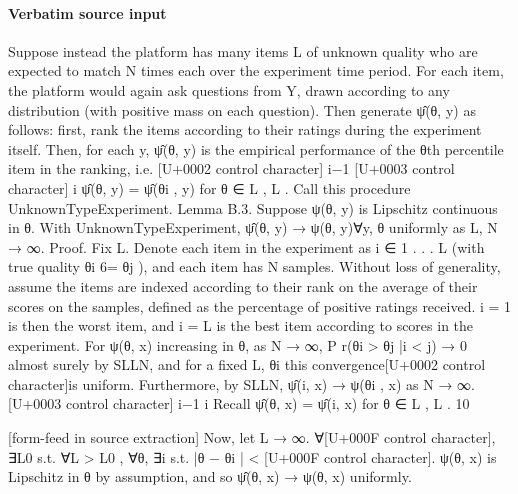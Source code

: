 \documentclass[10pt]{article}
\begin{document}
\paragraph{Verbatim source input}
\begin{ReviewVerbatim}
Suppose instead the platform has many items L of unknown quality who are expected to match N
times each over the experiment time period. For each item, the platform would again ask questions
from Y, drawn according to any distribution (with positive mass on each question). Then generate
ψ̂(θ, y) as follows: first, rank the items according to their ratings during the experiment itself.
Then, for each y, ψ̂(θ, y) is
the empirical
performance of the θth percentile item in the ranking, i.e.
[U+0002 control character] i−1
[U+0003 control character]
i
ψ̂(θ, y) = ψ̂(θi , y) for θ ∈ L , L . Call this procedure UnknownTypeExperiment.
Lemma B.3. Suppose ψ(θ, y) is Lipschitz continuous in θ. With UnknownTypeExperiment, ψ̂(θ, y) →
ψ(θ, y)∀y, θ uniformly as L, N → ∞.
Proof. Fix L. Denote each item in the experiment as i ∈ {1 . . . L} (with true quality θi 6= θj ),
and each item has N samples. Without loss of generality, assume the items are indexed according
to their rank on the average of their scores on the samples, defined as the percentage of positive
ratings received. i = 1 is then the worst item, and i = L is the best item according to scores in the
experiment.
For ψ(θ, x) increasing in θ, as N → ∞, P r(θi > θj |i < j) → 0 almost surely by SLLN, and for
a fixed L, {θi } this convergence[U+0002 control character]is uniform.
Furthermore, by SLLN, ψ̂(i, x) → ψ(θi , x) as N → ∞.
[U+0003 control character]
i−1 i
Recall ψ̂(θ, x) = ψ̂(i, x) for θ ∈ L , L .
10


[form-feed in source extraction]
Now, let L → ∞. ∀[U+000F control character], ∃L0 s.t. ∀L > L0 , ∀θ, ∃i s.t. |θ − θi | < [U+000F control character]. ψ(θ, x) is Lipschitz in θ by
assumption, and so ψ̂(θ, x) → ψ(θ, x) uniformly.
\end{ReviewVerbatim}
\end{document}

